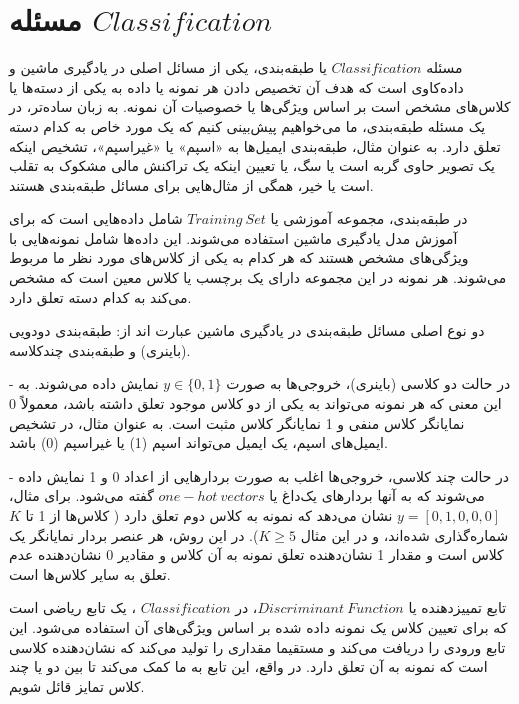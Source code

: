 \documentclass[12pt]{article}
\begin{document}
\fontsize{12pt}{14pt}\selectfont



\section{ مسئله $Classification$}

مسئله $Classification$ یا طبقه‌بندی، یکی از مسائل اصلی در یادگیری ماشین و داده‌کاوی است که هدف آن تخصیص دادن هر نمونه یا داده به یکی از دسته‌ها یا کلاس‌های مشخص است بر اساس ویژگی‌ها یا خصوصیات آن نمونه. به زبان ساده‌تر، در یک مسئله طبقه‌بندی، ما می‌خواهیم پیش‌بینی کنیم که یک مورد خاص به کدام دسته تعلق دارد. به عنوان مثال، طبقه‌بندی ایمیل‌ها به «اسپم» یا «غیراسپم»، تشخیص اینکه یک تصویر حاوی گربه است یا سگ، یا تعیین اینکه یک تراکنش مالی مشکوک به تقلب است یا خیر، همگی از مثال‌هایی برای مسائل طبقه‌بندی هستند.

در طبقه‌بندی، مجموعه آموزشی یا $Training\:Set$ شامل داده‌هایی است که برای آموزش مدل یادگیری ماشین استفاده می‌شوند. این داده‌ها شامل نمونه‌هایی با ویژگی‌های مشخص هستند که هر کدام به یکی از کلاس‌های مورد نظر ما مربوط می‌شوند. هر نمونه در این مجموعه دارای یک برچسب یا کلاس معین است که مشخص می‌کند به کدام دسته تعلق دارد. 

دو نوع اصلی مسائل طبقه‌بندی در یادگیری ماشین عبارت اند از: طبقه‌بندی دودویی (باینری) و طبقه‌بندی چندکلاسه.

- در حالت دو کلاسی (باینری)، خروجی‌ها به صورت \(y \in \{0, 1\}\) نمایش داده می‌شوند. به این معنی که هر نمونه می‌تواند به یکی از دو کلاس موجود تعلق داشته باشد، معمولاً 0 نمایانگر کلاس منفی و 1 نمایانگر کلاس مثبت است. به عنوان مثال، در تشخیص ایمیل‌های اسپم، یک ایمیل می‌تواند اسپم (1) یا غیراسپم (0) باشد. 

- در حالت چند کلاسی، خروجی‌ها اغلب به صورت بردارهایی از اعداد 0 و 1 نمایش داده می‌شوند که به آنها بردارهای یک‌داغ یا $one-hot\:vectors$ گفته می‌شود. برای مثال، \(y = [0, 1, 0, 0, 0]\) نشان می‌دهد که نمونه به کلاس دوم تعلق دارد ( کلاس‌ها از 1 تا \(K\) شماره‌گذاری شده‌اند، و در این مثال \(K\geq5\)). در این روش، هر عنصر بردار نمایانگر یک کلاس است و مقدار 1 نشان‌دهنده تعلق نمونه به آن کلاس و مقادیر 0 نشان‌دهنده عدم تعلق به سایر کلاس‌ها است.

تابع تمییزدهنده یا $Discriminant\:Function$، در $Classification$   ، یک تابع ریاضی است که برای تعیین کلاس یک نمونه داده شده بر اساس ویژگی‌های آن استفاده می‌شود. این تابع ورودی را دریافت می‌کند و مستقیما مقداری را تولید می‌کند که نشان‌دهنده کلاسی است که نمونه به آن تعلق دارد. در واقع، این تابع به ما کمک می‌کند تا بین دو یا چند کلاس تمایز قائل شویم.
\end{document}
